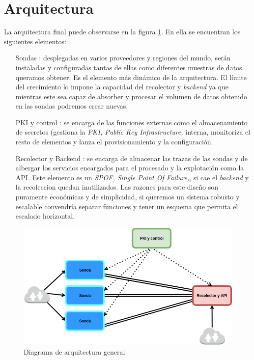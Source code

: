 \section{Arquitectura}

La arquitectura final puede observarse en la figura \ref{fig:arquitectura-general}. En ella se encuentran los siguientes elementos:

\begin{enumerate}
    \item[Sondas]: desplegadas en varios proveedores y regiones del mundo, serán instaladas y configuradas tantas de ellas como
    diferentes muestras de datos queramos obtener. Es el elemento más dinámico de la arquitectura. El límite del crecimiento lo impone la capacidad
    del recolector y \emph{backend} ya que mientras este sea capaz de absorber y procesar el volumen de datos obtenido en las sondas podremos crear nuevas.
    \item[PKI y control]: se encarga de las funciones externas como el almacenamiento de secretos (gestiona la \emph{PKI, Public Key Infrastructure,} interna, monitoriza el resto de elementos y lanza el provisionamiento y la configuración.
    \item[Recolector y Backend]: se encarga de almacenar las trazas de las sondas y de albergar los servicios encargados para el procesado y la explotación como la API. Este elemento es un \emph{SPOF, Single Point Of Failure,}, si cae el \emph{backend} y la recoleccion quedan inutilizados.
    Las razones para este diseño son puramente económicas y de simplicidad, si queremos un sistema robusto y escalable convendría separar funciones y tener un esquema que permita el escalado horizontal.
\end{enumerate}

\begin{figure}[h]
    \centering
      \includegraphics[scale=0.5]{images/arquitectura_general}
    \caption{Diagrama de arquitectura general}
    \label{fig:arquitectura-general}
  \end{figure}


